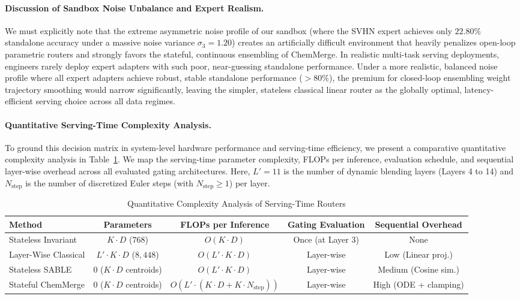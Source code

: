 \paragraph{Discussion of Sandbox Noise Unbalance and Expert Realism.}
We must explicitly note that the extreme asymmetric noise profile of our sandbox (where the SVHN expert achieves only $22.80\%$ standalone accuracy under a massive noise variance $\sigma_3 = 1.20$) creates an artificially difficult environment that heavily penalizes open-loop parametric routers and strongly favors the stateful, continuous ensembling of ChemMerge. In realistic multi-task serving deployments, engineers rarely deploy expert adapters with such poor, near-guessing standalone performance. Under a more realistic, balanced noise profile where all expert adapters achieve robust, stable standalone performance ($>80\%$), the premium for closed-loop ensembling weight trajectory smoothing would narrow significantly, leaving the simpler, stateless classical linear router as the globally optimal, latency-efficient serving choice across all data regimes.

\paragraph{Quantitative Serving-Time Complexity Analysis.}
To ground this decision matrix in system-level hardware performance and serving-time efficiency, we present a comparative quantitative complexity analysis in Table~\ref{tab:serving_complexity}. We map the serving-time parameter complexity, FLOPs per inference, evaluation schedule, and sequential layer-wise overhead across all evaluated gating architectures. Here, $L' = 11$ is the number of dynamic blending layers (Layers 4 to 14) and $N_{\text{step}}$ is the number of discretized Euler steps (with $N_{\text{step}} \ge 1$) per layer.

\begin{table}[ht]
\caption{Quantitative Complexity Analysis of Serving-Time Routers}
\label{tab:serving_complexity}
\centering
\begin{footnotesize}
\setlength{\tabcolsep}{3.0pt}
\begin{tabular}{lcccc}
\toprule
\textbf{Method} & \textbf{Parameters} & \textbf{FLOPs per Inference} & \textbf{Gating Evaluation} & \textbf{Sequential Overhead} \\
\midrule
Stateless Invariant & $K \cdot D$ ($768$) & $O(K \cdot D)$ & Once (at Layer 3) & None \\
Layer-Wise Classical & $L' \cdot K \cdot D$ ($8,448$) & $O(L' \cdot K \cdot D)$ & Layer-wise & Low (Linear proj.) \\
Stateless SABLE & $0$ ($K \cdot D$ centroids) & $O(L' \cdot K \cdot D)$ & Layer-wise & Medium (Cosine sim.) \\
Stateful ChemMerge & $0$ ($K \cdot D$ centroids) & $O(L' \cdot (K \cdot D + K \cdot N_{\text{step}}))$ & Layer-wise & High (ODE + clamping) \\
\bottomrule
\end{tabular}
\end{footnotesize}
\end{table}

